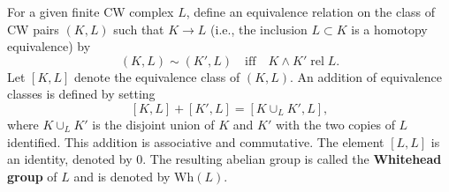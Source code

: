 For a given finite CW complex $L$, define an equivalence relation on the class of CW pairs $(K, L)$ such that $K \to L$ (i.e., the inclusion $L \subset K$ is a homotopy equivalence) by
$$(K, L) \sim (K', L) \quad \text{iff} \quad K \wedge K' \; \mathrm{rel} \; L.$$
Let $[K, L]$ denote the equivalence class of $(K, L)$. An addition of equivalence classes is defined by setting
$$[K, L] + [K', L] = [K \cup_L K', L],$$
where $K \cup_L K'$ is the disjoint union of $K$ and $K'$ with the two copies of $L$ identified. This addition is associative and commutative. The element $[L, L]$ is an identity, denoted by $0$. The resulting abelian group is called the \textbf{Whitehead group} of $L$ and is denoted by $\mathrm{Wh}(L)$.

